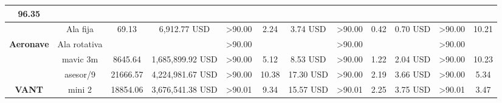 \begin{landscape}
\begin{table}[]
\begin{tabular}{cc|ccc|ccc|ccc|c|}
      96.35 \\ \hline
    \multicolumn{1}{|c|}{\cellcolor[HTML]{9698ED}} &
      \cellcolor[HTML]{9698ED}Ala fija &
      \multicolumn{1}{c|}{69.13} &
      \multicolumn{1}{c|}{6,912.77 USD} &
      \textgreater{}90.00 &
      \multicolumn{1}{c|}{2.24} &
      \multicolumn{1}{c|}{3.74 USD} &
      \textgreater{}90.00 &
      \multicolumn{1}{c|}{0.42} &
      \multicolumn{1}{c|}{0.70 USD} &
      \textgreater{}90.00 &
      10.21 \\ \cline{2-12} 
    \multicolumn{1}{|c|}{\multirow{-2}{*}{\cellcolor[HTML]{9698ED}\textbf{Aeronave}}} &
      \cellcolor[HTML]{9698ED}Ala rotativa &
      \multicolumn{1}{c|}{} &
      \multicolumn{1}{c|}{} &
      \textgreater{}90.00 &
      \multicolumn{1}{c|}{} &
      \multicolumn{1}{c|}{} &
      \textgreater{}90.00 &
      \multicolumn{1}{c|}{} &
      \multicolumn{1}{c|}{} &
      \textgreater{}90.00 &
       \\ \hline
    \multicolumn{1}{|c|}{\cellcolor[HTML]{9698ED}} &
      \cellcolor[HTML]{9698ED}mavic 3m &
      \multicolumn{1}{c|}{8645.64} &
      \multicolumn{1}{c|}{ 1,685,899.92  USD} &
      \textgreater{}90.00 &
      \multicolumn{1}{c|}{5.12} &
      \multicolumn{1}{c|}{8.53 USD} &
      \textgreater{}90.00 &
      \multicolumn{1}{c|}{1.22} &
      \multicolumn{1}{c|}{2.04 USD} &
      \textgreater{}90.00 &
      10.23 \\ \cline{2-12} 
    \multicolumn{1}{|c|}{\cellcolor[HTML]{9698ED}} &
      \cellcolor[HTML]{9698ED}asesor/9 &
      \multicolumn{1}{c|}{21666.57} &
      \multicolumn{1}{c|}{ 4,224,981.67 USD } &
      \textgreater{}90.00 &
      \multicolumn{1}{c|}{10.38} &
      \multicolumn{1}{c|}{17.30 USD} &
      \textgreater{}90.00 &
      \multicolumn{1}{c|}{2.19} &
      \multicolumn{1}{c|}{3.66 USD} &
      \textgreater{}90.00 &
      5.34 \\ \cline{2-12} 
    \multicolumn{1}{|c|}{\multirow{-3}{*}{\cellcolor[HTML]{9698ED}\textbf{VANT}}} &
      \cellcolor[HTML]{9698ED}mini 2 &
      \multicolumn{1}{c|}{18854.06} &
      \multicolumn{1}{c|}{ 3,676,541.38 USD } &
      \textgreater{}90.01 &
      \multicolumn{1}{c|}{9.34} &
      \multicolumn{1}{c|}{15.57 USD} &
      \textgreater{}90.01 &
      \multicolumn{1}{c|}{2.25} &
      \multicolumn{1}{c|}{3.75 USD} &
      \textgreater{}90.01 &
      3.47 \\ \hline
    \end{tabular}%

\end{table}
\end{landscape}
